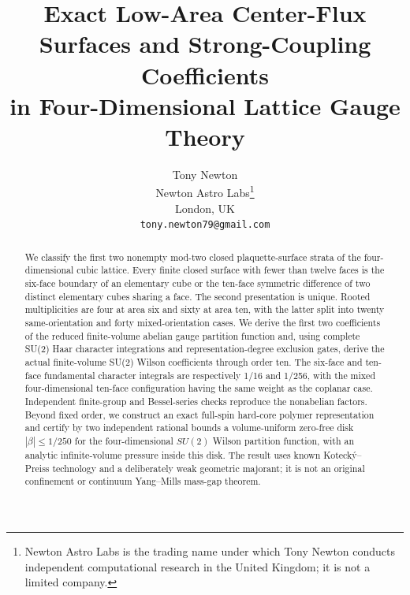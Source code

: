\documentclass[11pt,a4paper]{article}
\title{\textbf{Exact Low-Area Center-Flux Surfaces and Strong-Coupling Coefficients}\\in Four-Dimensional Lattice Gauge Theory}
\author{Tony Newton\\Newton Astro Labs\thanks{Newton Astro Labs is the trading name under which Tony Newton conducts independent computational research in the United Kingdom; it is not a limited company.}\\London, UK\\\texttt{tony.newton79@gmail.com}}
\date{}
\begin{document}
\maketitle
\begin{abstract}
We classify the first two nonempty mod-two closed plaquette-surface strata of the four-dimensional cubic lattice. Every finite closed surface with fewer than twelve faces is the six-face boundary of an elementary cube or the ten-face symmetric difference of two distinct elementary cubes sharing a face. The second presentation is unique. Rooted multiplicities are four at area six and sixty at area ten, with the latter split into twenty same-orientation and forty mixed-orientation cases. We derive the first two coefficients of the reduced finite-volume abelian gauge partition function and, using complete SU(2) Haar character integrations and representation-degree exclusion gates, derive the actual finite-volume SU(2) Wilson coefficients through order ten. The six-face and ten-face fundamental character integrals are respectively 1/16 and 1/256, with the mixed four-dimensional ten-face configuration having the same weight as the coplanar case. Independent finite-group and Bessel-series checks reproduce the nonabelian factors. Beyond fixed order, we construct an exact full-spin hard-core polymer representation and certify by two independent rational bounds a volume-uniform zero-free disk $|\beta|\le1/250$ for the four-dimensional $SU(2)$ Wilson partition function, with an analytic infinite-volume pressure inside this disk. The result uses known Koteck\'y--Preiss technology and a deliberately weak geometric majorant; it is not an original confinement or continuum Yang--Mills mass-gap theorem.
\end{abstract}

\begin{center}
\end{center}
\end{document}
